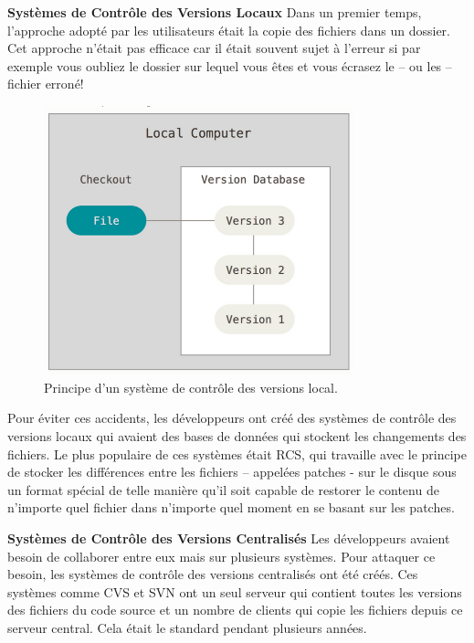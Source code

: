 \textbf{Systèmes de Contrôle des Versions Locaux} \newline
Dans un premier temps, l’approche adopté par les utilisateurs était la copie des fichiers dans un dossier. Cet approche n’était pas efficace car il était souvent sujet à l’erreur si par exemple vous oubliez le dossier sur lequel vous êtes et vous écrasez le – ou les – fichier erroné!


\begin{figure}[H]
    \centering
    \includegraphics[width=9cm]{images/local-scm.png}
    \caption{Principe d'un système de contrôle des versions local.}
    \label{fig:local-scm}
\end{figure}

Pour éviter ces accidents, les développeurs ont créé des systèmes de contrôle des versions locaux qui avaient des bases de données qui stockent les changements des fichiers. Le plus populaire de ces systèmes était RCS, qui travaille avec le principe de stocker les différences entre les fichiers – appelées patches - sur le disque sous un format spécial de telle manière qu’il soit capable de restorer le contenu de n’importe quel fichier dans n’importe quel moment en se basant sur les patches.
\newline

\textbf{Systèmes de Contrôle des Versions Centralisés} \newline
Les développeurs avaient besoin de collaborer entre eux mais sur plusieurs systèmes. Pour attaquer ce besoin, les systèmes de contrôle des versions centralisés ont été créés. Ces systèmes comme CVS et SVN ont un seul serveur qui contient toutes les versions des fichiers du code source et un nombre de clients qui copie les fichiers depuis ce serveur central. Cela était le standard pendant plusieurs années.

